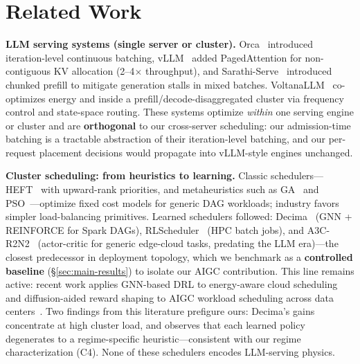 \section{Related Work}
\label{sec:related}

\textbf{LLM serving systems (single server or cluster).}
Orca~\cite{yu2022orca} introduced iteration-level continuous
batching, vLLM~\cite{kwon2023vllm} added PagedAttention
for non-contiguous KV allocation
(2--4$\times$ throughput), and
Sarathi-Serve~\cite{agrawal2024sarathi} introduced chunked
prefill to mitigate generation stalls in mixed batches.
VoltanaLLM~\cite{yu2025voltana} co-optimizes energy and \slo{}
inside a prefill/decode-disaggregated cluster via frequency
control and state-space routing. These systems optimize
\emph{within} one serving engine or cluster and are
\textbf{orthogonal} to our cross-server scheduling: our
admission-time batching is a tractable abstraction of their
iteration-level batching, and our per-request placement
decisions would propagate into vLLM-style engines unchanged.

\textbf{Cluster scheduling: from heuristics to learning.}
Classic schedulers---HEFT~\cite{topcuoglu2002heft} with
upward-rank priorities, and metaheuristics such as
GA~\cite{holland1975adaptation} and
PSO~\cite{kennedy1995pso}---optimize fixed cost models for
generic DAG workloads; industry favors simpler load-balancing
primitives. Learned schedulers followed:
Decima~\cite{mao2019decima} (GNN + REINFORCE for Spark DAGs),
RLScheduler~\cite{zhang2020rlscheduler} (HPC batch jobs), and
A3C-R2N2~\cite{tuli2022a3cr2n} (actor-critic for generic
edge-cloud tasks, predating the LLM era)---the closest
predecessor in deployment topology, which we benchmark as a
\textbf{controlled baseline} (\S\ref{sec:main-results}) to
isolate our AIGC contribution. This line remains active:
recent work applies GNN-based DRL to energy-aware cloud
scheduling~\cite{dagtopology2026} and diffusion-aided reward
shaping to AIGC workload scheduling across data
centers~\cite{aigcenergy2026}. Two findings from this
literature prefigure ours: Decima's gains concentrate at high
cluster load, and \cite{dagtopology2026} observes that each
learned policy degenerates to a regime-specific
heuristic---consistent with our regime characterization (C4).
None of these schedulers encodes LLM-serving physics.

